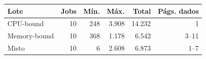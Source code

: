 \begin{tabular}{@{}lrrrrr@{}}
\toprule
Lote & Jobs & Mín. & Máx. & Total & Págs. dados \\
\midrule
CPU-bound & 10 & 248 & 3.908 & 14.232 & 1 \\
Memory-bound & 10 & 368 & 1.178 & 6.542 & 3--11 \\
Misto & 10 & 6 & 2.608 & 6.873 & 1--7 \\
\bottomrule
\end{tabular}
